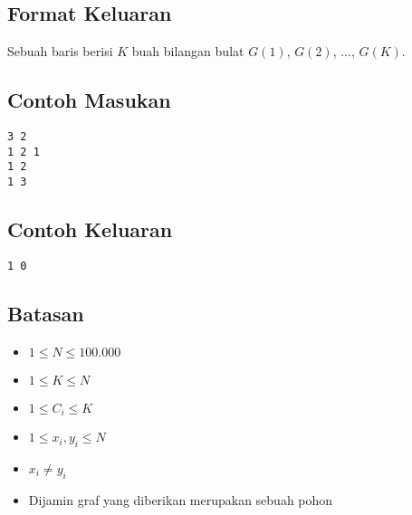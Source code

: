\documentclass{article}
\begin{document}
\subsection*{Format Keluaran}
\par\noindent Sebuah baris berisi $K$ buah bilangan bulat $G(1)$, $G(2)$, ..., $G(K)$.

\subsection*{Contoh Masukan}

\begin{lstlisting}
3 2
1 2 1
1 2
1 3
\end{lstlisting}

\subsection*{Contoh Keluaran}

\begin{lstlisting}
1 0
\end{lstlisting}


\subsection*{Batasan}

\begin{itemize}
	\item $1 \leq N \leq 100.000$
    \item $1 \leq K \leq N$
    \item $1 \leq C_i \leq K$
    \item $1 \leq x_i, y_i \leq N$
    \item $x_i \neq y_i$
    \item Dijamin graf yang diberikan merupakan sebuah pohon
    
\end{itemize}
\end{document}
